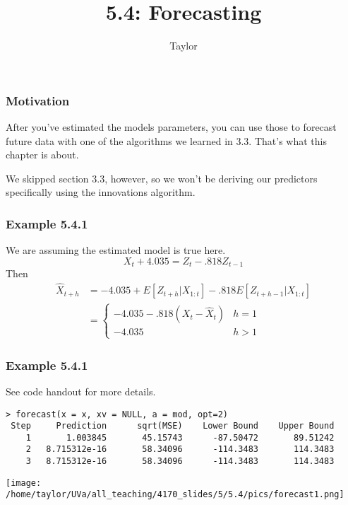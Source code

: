 \documentclass{beamer}
\title["5.4"]{5.4: Forecasting}
\author{Taylor}
\institute[UVA] 
{
University of Virginia \\
\medskip
\textit{} 
}
\date{}
\begin{document}

\begin{frame}
\titlepage 
\end{frame}

\begin{frame}
\frametitle{Motivation}

After you've estimated the models parameters, you can use those to forecast future data with one of the algorithms we learned in 3.3. That's what this chapter is about.
\newline

We skipped section 3.3, however, so we won't be deriving our predictors specifically using the innovations algorithm. 


\end{frame}



\begin{frame}
\frametitle{Example 5.4.1}

We are assuming the estimated model is true here.
\[
X_t + 4.035 = Z_t - .818 Z_{t-1}
\]
Then
\begin{align*}
\hat{X}_{t+h} &= - 4.035 + E[Z_{t+h}|X_{1:t}] - .818 E[Z_{t+h-1}|X_{1:t}] \\
&= 
\begin{cases}
-4.035 -.818(X_t - \hat{X}_t) & h=1 \\
-4.035 & h > 1
\end{cases}
\end{align*}


\end{frame}


\begin{frame}[fragile]
\frametitle{Example 5.4.1}

See code handout for more details.

\begin{verbatim}
> forecast(x = x, xv = NULL, a = mod, opt=2)
 Step     Prediction      sqrt(MSE)    Lower Bound    Upper Bound
    1       1.003845       45.15743      -87.50472       89.51242
    2   8.715312e-16       58.34096      -114.3483       114.3483
    3   8.715312e-16       58.34096      -114.3483       114.3483
\end{verbatim}

\texttt{[image: /home/taylor/UVa/all\_teaching/4170\_slides/5/5.4/pics/forecast1.png]}

\end{frame}
\end{document}
